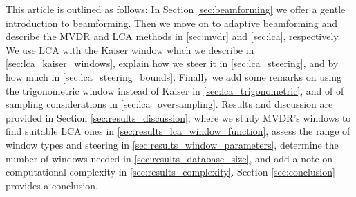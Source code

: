 \documentclass[10pt,journal,draftclsnofoot,onecolumn]{IEEEtran}
\newcommand\1{\vec 1}
\providecommand{\DIFadd}[1]{{\protect\color{blue}\uwave{#1}}} %
\providecommand{\DIFaddbegin}{} %
\providecommand{\DIFaddend}{} %
\begin{document}
This article is outlined as follows: In Section \ref{sec:beamforming} we offer a gentle introduction to beamforming. Then we move on to adaptive beamforming and describe the MVDR and LCA methods in \ref{sec:mvdr} and \ref{sec:lca}, respectively. We use LCA with the Kaiser window which we describe in \ref{sec:lca_kaiser_windows}, explain how we steer it in \ref{sec:lca_steering}, and by how much in \ref{sec:lca_steering_bounds}. Finally we add some remarks on using the trigonometric window instead of Kaiser in \ref{sec:lca_trigonometric}, and of of sampling considerations in \ref{sec:lca_oversampling}. Results and discussion are provided in Section \ref{sec:results_discussion}, where we study MVDR's windows to find suitable LCA ones in \ref{sec:results_lca_window_function}, assess the range of window types and steering in \ref{sec:results_window_parameters}, determine the number of windows needed in \ref{sec:results_database_size}, and add a note on computational complexity in \ref{sec:results_complexity}. \DIFaddbegin \DIFadd{Finally, }\DIFaddend Section \ref{sec:conclusion} provides a conclusion.


% 
% 
% 
% 
% 
% 
\end{document}
